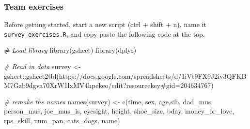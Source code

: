 \documentclass[
]{book}
\newenvironment{Shaded}{\begin{snugshade}}{\end{snugshade}}
\newcommand{\CommentTok}[1]{\textcolor[rgb]{0.56,0.35,0.01}{\textit{#1}}}
\newcommand{\FunctionTok}[1]{\textcolor[rgb]{0.00,0.00,0.00}{#1}}
\newcommand{\NormalTok}[1]{#1}
\newcommand{\OtherTok}[1]{\textcolor[rgb]{0.56,0.35,0.01}{#1}}
\newcommand{\SpecialCharTok}[1]{\textcolor[rgb]{0.00,0.00,0.00}{#1}}
\newcommand{\StringTok}[1]{\textcolor[rgb]{0.31,0.60,0.02}{#1}}
\begin{document}
\hypertarget{team-exercises}{%
\subsubsection*{Team exercises}\label{team-exercises}}

Before getting started, start a new script (ctrl + shift + n), name it \texttt{survey\_exercises.R}, and copy-paste the following code at the top.

\begin{Shaded}
\begin{Highlighting}[]
\CommentTok{\# Load library}
\FunctionTok{library}\NormalTok{(gsheet)}
\FunctionTok{library}\NormalTok{(dplyr)}

\CommentTok{\# Read in data}
\NormalTok{survey  }\OtherTok{\textless{}{-}}\NormalTok{ gsheet}\SpecialCharTok{::}\FunctionTok{gsheet2tbl}\NormalTok{(}\StringTok{\textquotesingle{}https://docs.google.com/spreadsheets/d/1iVt9FX9J2iv3QFKBM7Gzb9dgva70XrW1lxMV4hpekeo/edit?resourcekey\#gid=204634767\textquotesingle{}}\NormalTok{)}

\CommentTok{\# remake the names}
\FunctionTok{names}\NormalTok{(survey) }\OtherTok{\textless{}{-}} \FunctionTok{c}\NormalTok{(}\StringTok{\textquotesingle{}time\textquotesingle{}}\NormalTok{, }\StringTok{\textquotesingle{}sex\textquotesingle{}}\NormalTok{, }\StringTok{\textquotesingle{}age\textquotesingle{}}\NormalTok{,}\StringTok{\textquotesingle{}sib\textquotesingle{}}\NormalTok{, }\StringTok{\textquotesingle{}dad\_mus\textquotesingle{}}\NormalTok{, }\StringTok{\textquotesingle{}person\_mus\textquotesingle{}}\NormalTok{, }\StringTok{\textquotesingle{}joe\_mus\_is\textquotesingle{}}\NormalTok{, }\StringTok{\textquotesingle{}eyesight\textquotesingle{}}\NormalTok{, }\StringTok{\textquotesingle{}height\textquotesingle{}}\NormalTok{, }\StringTok{\textquotesingle{}shoe\_size\textquotesingle{}}\NormalTok{, }\StringTok{\textquotesingle{}bday\textquotesingle{}}\NormalTok{, }\StringTok{\textquotesingle{}money\_or\_love\textquotesingle{}}\NormalTok{, }\StringTok{\textquotesingle{}rps\_skill\textquotesingle{}}\NormalTok{, }\StringTok{\textquotesingle{}num\_pan\textquotesingle{}}\NormalTok{, }\StringTok{\textquotesingle{}cats\_dogs\textquotesingle{}}\NormalTok{, }\StringTok{\textquotesingle{}name\textquotesingle{}}\NormalTok{)}
\end{Highlighting}
\end{Shaded}
\end{document}
